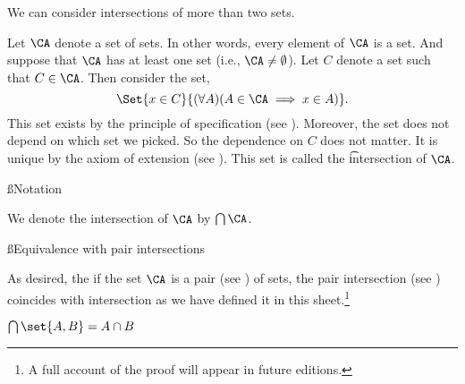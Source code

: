 

We can consider intersections of more than two sets.



Let $\CA$ denote a set of sets.
In other words, every element of $\CA$ is a set.
And suppose that $\CA$ has at least one set (i.e., $\CA \neq \emptyset$).
Let $C$ denote a set such that $C \in \CA$.
Then consider the set,
\[
	\Set{x \in C}{(\forall A)(A \in \CA \implies x \in A)}.
\]
This set exists by the principle of specification (see ).
Moreover, the set does not depend on which set we picked.
So the dependence on $C$ does not matter.
It is unique by the axiom of extension (see ).
This set is called the \t{intersection} of $\CA$.

\ss{Notation}

We denote the intersection of $\CA$ by $\bigcap \CA$.

\ss{Equivalence with pair intersections}

As desired, the if the set $\CA$ is a pair (see ) of sets, the pair intersection (see ) coincides with intersection as we have defined it in this sheet.\footnote{A full account of the proof will appear in future editions.}

\begin{proposition}
  $\bigcap \set{A, B} = A \cap B$
\end{proposition}
\blankpage

%

